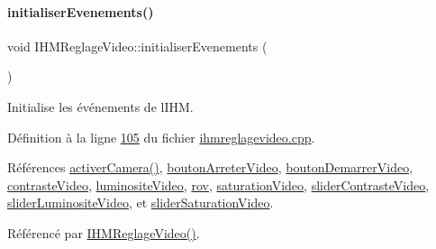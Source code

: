 \paragraph{\texorpdfstring{initialiser\+Evenements()}{initialiserEvenements()}}
{\footnotesize\ttfamily void I\+H\+M\+Reglage\+Video\+::initialiser\+Evenements (\begin{DoxyParamCaption}{ }\end{DoxyParamCaption})\hspace{0.3cm}{\ttfamily [private]}}



Initialise les événements de l\textquotesingle{}I\+HM. 



Définition à la ligne \hyperlink{ihmreglagevideo_8cpp_source_l00105}{105} du fichier \hyperlink{ihmreglagevideo_8cpp_source}{ihmreglagevideo.\+cpp}.



Références \hyperlink{ihmreglagevideo_8cpp_source_l00203}{activer\+Camera()}, \hyperlink{ihmreglagevideo_8h_source_l00042}{bouton\+Arreter\+Video}, \hyperlink{ihmreglagevideo_8h_source_l00041}{bouton\+Demarrer\+Video}, \hyperlink{ihmreglagevideo_8h_source_l00035}{contraste\+Video}, \hyperlink{ihmreglagevideo_8h_source_l00034}{luminosite\+Video}, \hyperlink{ihmreglagevideo_8h_source_l00027}{rov}, \hyperlink{ihmreglagevideo_8h_source_l00036}{saturation\+Video}, \hyperlink{ihmreglagevideo_8h_source_l00029}{slider\+Contraste\+Video}, \hyperlink{ihmreglagevideo_8h_source_l00028}{slider\+Luminosite\+Video}, et \hyperlink{ihmreglagevideo_8h_source_l00030}{slider\+Saturation\+Video}.



Référencé par \hyperlink{ihmreglagevideo_8cpp_source_l00009}{I\+H\+M\+Reglage\+Video()}.


